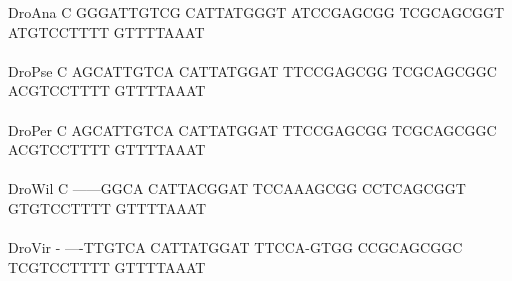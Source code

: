 \documentclass[11pt,twoside,reqno,a4paper]{article}
\begin{document}
{DroAna	C	GGGATTGTCG	CATTATGGGT	ATCCGAGCGG	TCGCAGCGGT	ATGTCCTTTT	GTTTTAAAT\\
\hspace*{7\charwidth}\hspace*{1\charwidth}\hspace*{1\charwidth}\hspace*{1\charwidth}\hspace*{1\charwidth}\hspace*{1\charwidth}\hspace*{1\charwidth}\\
DroPse	C	AGCATTGTCA	CATTATGGAT	TTCCGAGCGG	TCGCAGCGGC	ACGTCCTTTT	GTTTTAAAT\\
\hspace*{7\charwidth}\hspace*{1\charwidth}\hspace*{1\charwidth}\hspace*{1\charwidth}\hspace*{1\charwidth}\hspace*{1\charwidth}\hspace*{1\charwidth}\\
DroPer	C	AGCATTGTCA	CATTATGGAT	TTCCGAGCGG	TCGCAGCGGC	ACGTCCTTTT	GTTTTAAAT\\
\hspace*{7\charwidth}\hspace*{1\charwidth}\hspace*{1\charwidth}\hspace*{1\charwidth}\hspace*{1\charwidth}\hspace*{1\charwidth}\hspace*{1\charwidth}\\
DroWil	C	------GGCA	CATTACGGAT	TCCAAAGCGG	CCTCAGCGGT	GTGTCCTTTT	GTTTTAAAT\\
\hspace*{7\charwidth}\hspace*{1\charwidth}\hspace*{1\charwidth}\hspace*{1\charwidth}\hspace*{1\charwidth}\hspace*{1\charwidth}\hspace*{1\charwidth}\\
DroVir	-	----TTGTCA	CATTATGGAT	TTCCA-GTGG	CCGCAGCGGC	TCGTCCTTTT	GTTTTAAAT\\
\hspace*{7\charwidth}\hspace*{1\charwidth}\hspace*{1\charwidth}\hspace*{1\charwidth}\hspace*{1\charwidth}\hspace*{1\charwidth}\hspace*{1\charwidth}\\
}
\end{document}
